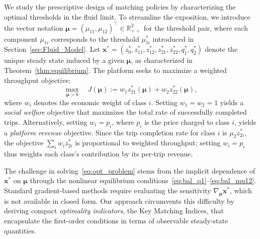 We study the prescriptive design of matching policies by characterizing the optimal 
thresholds in the fluid limit.
To streamline the exposition, we introduce the vector notation 
$\boldsymbol{\mu} = (\mu_{11}, \mu_{12})^\top \in \mathbb{R}_{++}^2$ for the 
threshold pair, where each component $\mu_{1i}$ corresponds to the threshold 
$\mu_{1i}^*$ introduced in Section~\ref{sec:Fluid_Model}.
Let $\mathbf{x}^* = (z_0^*, z_{11}^*, z_{12}^*, z_{21}^*, z_{22}^*, q_1^*, q_2^*)$ 
denote the unique steady state induced by a given $\boldsymbol{\mu}$, as characterized 
in Theorem~\ref{thm:equilibrium}.
The platform seeks to maximize a weighted throughput objective:
\begin{equation}
\max_{\boldsymbol{\mu} > 0} 
\quad 
J(\boldsymbol{\mu})
    := 
    w_1 z_{21}^*(\boldsymbol{\mu})
    + 
    w_2 z_{22}^*(\boldsymbol{\mu}),
\label{eq:opt_problem}
\end{equation}
where $w_i$ denotes the economic weight of class $i$.
Setting $w_1 = w_2 = 1$ yields a \emph{social welfare} objective that maximizes 
the total rate of successfully completed trips.
Alternatively, setting $w_i = p_i$, where $p_i$ is the price charged to class $i$,
yields a \emph{platform revenue} objective.
Since the trip completion rate for class $i$ is $\mu_2 z_{2i}^*$, the objective $\sum_i w_i z_{2i}^*$ is proportional to weighted throughput; setting $w_i = p_i$ thus weights each class's contribution by its per-trip revenue.

The challenge in solving~\eqref{eq:opt_problem} stems from the implicit dependence 
of $\mathbf{x}^*$ on $\boldsymbol{\mu}$ through the nonlinear equilibrium 
conditions~\eqref{eq:bal_q1}--\eqref{eq:bal_mu12}.
Standard gradient-based methods require evaluating the sensitivity 
$\nabla_{\boldsymbol{\mu}} \mathbf{x}^*$, which is not available in closed form.
Our approach circumvents this difficulty by deriving compact
\emph{optimality indicators}, the Key Matching Indices, that encapsulate the first-order conditions
in terms of observable steady-state quantities.

